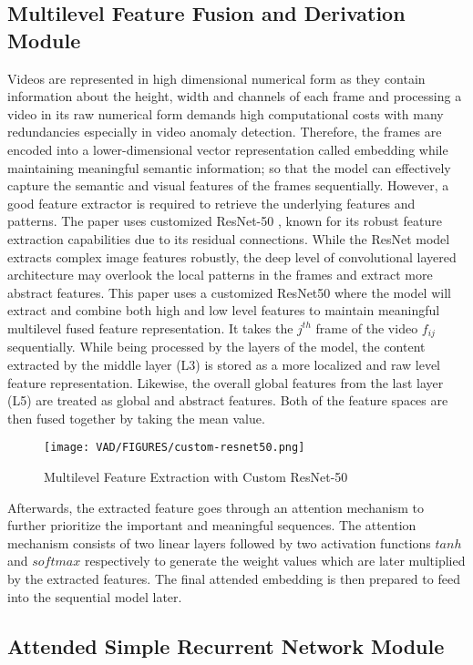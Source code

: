 \documentclass[runningheads]{llncs}
\begin{document}
\subsection{Multilevel Feature Fusion and Derivation Module}
Videos are represented in high dimensional numerical form as they contain information about the height, width and channels of each frame and processing a video in its raw numerical form demands high computational costs with many redundancies especially in video anomaly detection. Therefore, the frames are encoded into a lower-dimensional vector representation called embedding while maintaining meaningful semantic information; so that the model can effectively capture the semantic and visual features of the frames sequentially. However, a good feature extractor is required to retrieve the underlying features and patterns. The paper uses customized ResNet-50 \cite{he2015deep}, known for its robust feature extraction capabilities due to its residual connections. While the ResNet model extracts complex image features robustly, the deep level of convolutional layered architecture may overlook the local patterns in the frames and extract more abstract features. This paper uses a customized ResNet50 where the model will extract and combine both high and low level features to maintain meaningful multilevel fused feature representation. It takes the $j^{th}$ frame of the video $f_{ij}$ sequentially. While being processed by the layers of the model, the content extracted by the middle layer (L3) is stored as a more localized and raw level feature representation. Likewise, the overall global features from the last layer (L5) are treated as global and abstract features. Both of the feature spaces are then fused together by taking the mean value. 

\begin{figure}
\texttt{[image: VAD/FIGURES/custom-resnet50.png]}
\caption{Multilevel Feature Extraction with Custom ResNet-50} \label{fig2}
\end{figure}

\noindent Afterwards, the extracted feature goes through an attention mechanism to further prioritize the important and meaningful sequences. The attention mechanism consists of two linear layers followed by two activation functions $tanh$ and $softmax$ respectively to generate the weight values which are later multiplied by the extracted features. The final attended embedding is then prepared to feed into the sequential model later.

\subsection{Attended Simple Recurrent Network Module}
\end{document}
